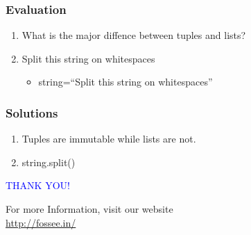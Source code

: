 \documentclass[presentation]{beamer}
\begin{document}
\begin{frame}
\frametitle{Evaluation}
\label{sec-14}


\begin{enumerate}
\item What is the major diffence between tuples and lists?
\vspace{12pt}
\item Split this string on whitespaces
\begin{itemize}
\item string=``Split this string on whitespaces''
\end{itemize}
\end{enumerate}
\end{frame}
\begin{frame}
\frametitle{Solutions}
\label{sec-15}


\begin{enumerate}
\item Tuples are immutable while lists are not.
\vspace{12pt}
\item string.split()
\end{enumerate}
\end{frame}
\begin{frame}

  \begin{block}{}
  \begin{center}
  \textcolor{blue}{\Large THANK YOU!} 
  \end{center}
  \end{block}
\begin{block}{}
  \begin{center}
    For more Information, visit our website\\
    \url{http://fossee.in/}
  \end{center}  
  \end{block}
\end{frame}
\end{document}
